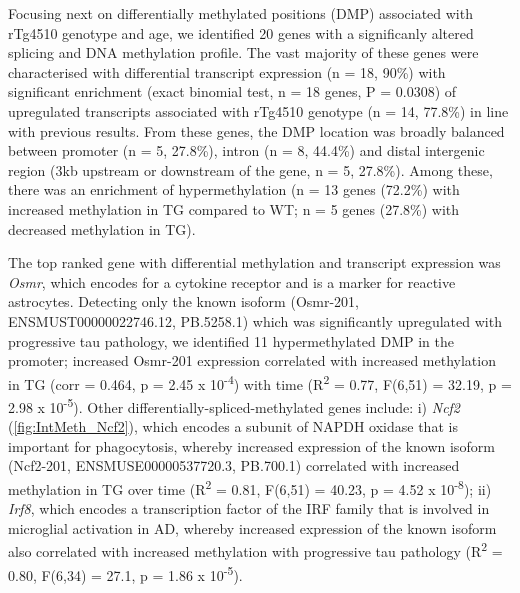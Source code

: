 Focusing next on differentially methylated positions (DMP) associated with rTg4510 genotype and age, we identified 20 genes with a significanly altered splicing and DNA methylation profile. The vast majority of these genes were characterised with differential transcript expression (n = 18, 90\%) with significant enrichment (exact binomial test, n = 18 genes, P = 0.0308) of upregulated transcripts associated with rTg4510 genotype (n = 14, 77.8\%) in line with previous results. From these genes, the DMP location was broadly balanced between promoter (n = 5, 27.8\%), intron (n = 8, 44.4\%) and distal intergenic region (3kb upstream or downstream of the gene, n = 5, 27.8\%). Among these, there was an enrichment of hypermethylation (n = 13 genes (72.2\%) with increased methylation in TG compared to WT; n = 5 genes (27.8\%) with decreased methylation in TG).  

The top ranked gene with differential methylation and transcript expression was \textit{Osmr}, which encodes for a cytokine receptor and is a marker for reactive astrocytes. Detecting only the known isoform (Osmr-201, ENSMUST00000022746.12, PB.5258.1) which was significantly upregulated with progressive tau pathology, we identified 11 hypermethylated DMP in the promoter; increased Osmr-201 expression correlated with increased methylation in TG (corr = 0.464, p = 2.45 x 10\textsuperscript{-4}) with time (R\textsuperscript{2} = 0.77, F(6,51) = 32.19, p = 2.98 x 10\textsuperscript{-5}). Other differentially-spliced-methylated genes include: i) \textit{Ncf2} (\cref{fig:IntMeth_Ncf2}), which encodes a subunit of NAPDH oxidase that is important for phagocytosis, whereby increased expression of the known isoform (Ncf2-201, ENSMUSE00000537720.3, PB.700.1) correlated with increased methylation in TG over time (R\textsuperscript{2} = 0.81, F(6,51) = 40.23, p = 4.52 x 10\textsuperscript{-8}); ii) \textit{Irf8}, which encodes a transcription factor of the IRF family that is involved in microglial activation in AD\cite{Zeng2017}, whereby increased expression of the known isoform also correlated with increased methylation with progressive tau pathology (R\textsuperscript{2} = 0.80, F(6,34) = 27.1, p = 1.86 x 10\textsuperscript{-5}). 



